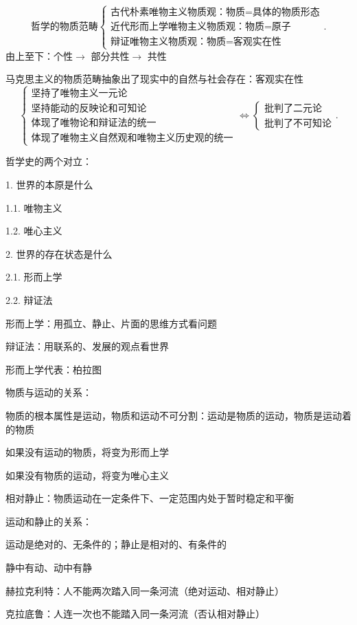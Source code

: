 \[
    \text{哲学的物质范畴}
    \begin{cases}
        \text{古代朴素唯物主义物质观：物质=具体的物质形态}\\
        \text{近代形而上学唯物主义物质观：物质=原子}\\
        \text{辩证唯物主义物质观：物质=客观实在性}
    \end{cases}
.\] 
由上至下：个性$\to $ 部分共性$\to $ 共性

马克思主义的物质范畴抽象出了现实中的自然与社会存在：客观实在性
\[
    \begin{cases}
        \text{坚持了唯物主义一元论}\\
        \text{坚持能动的反映论和可知论}\\
        \text{体现了唯物论和辩证法的统一}\\
        \text{体现了唯物主义自然观和唯物主义历史观的统一}
    \end{cases}\Leftrightarrow\begin{cases}
        \text{批判了二元论}\\
        \text{批判了不可知论}
    \end{cases}
.\]
\begin{notation}
    哲学史的两个对立：
    
    1. 世界的本原是什么

    1.1. 唯物主义

    1.2. 唯心主义

    2. 世界的存在状态是什么

    2.1. 形而上学

    2.2. 辩证法
\end{notation}
形而上学：用孤立、静止、片面的思维方式看问题

辩证法：用联系的、发展的观点看世界
\begin{notation}
    形而上学代表：柏拉图
\end{notation}
\begin{notation}
    物质与运动的关系：

    物质的根本属性是运动，物质和运动不可分割：运动是物质的运动，物质是运动着的物质
    
    如果没有运动的物质，将变为形而上学
    
    如果没有物质的运动，将变为唯心主义
\end{notation}
\begin{defi}
    相对静止：物质运动在一定条件下、一定范围内处于暂时稳定和平衡
\end{defi}
\begin{notation}
    运动和静止的关系：

    运动是绝对的、无条件的；静止是相对的、有条件的

    静中有动、动中有静
\end{notation}
\begin{eg}
    赫拉克利特：人不能两次踏入同一条河流（绝对运动、相对静止）

    克拉底鲁：人连一次也不能踏入同一条河流（否认相对静止）
\end{eg}
